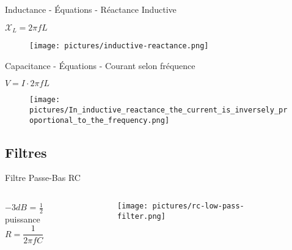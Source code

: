 \begin{frame}{Inductance - Équations - Réactance Inductive}
    \begin{center}
        \Large{
            $\mathcal{X}_L = 2 \pi f L$
        }
        \vspace{15pt}
        \begin{figure}
            \centering
            \texttt{[image: pictures/inductive-reactance.png]}
        \end{figure}
    \end{center}
\end{frame}

\begin{frame}{Capacitance - Équations - Courant selon fréquence}
    \begin{center}
        \Large{
            $V = I \cdot 2 \pi f L$
        }
        \vspace{15pt}
        \begin{figure}
            \centering
            \texttt{[image: pictures/In\_inductive\_reactance\_the\_current\_is\_inversely\_proportional\_to\_the\_frequency.png]}
        \end{figure}
    \end{center}
\end{frame}


\subsection{Filtres}
\begin{frame}{Filtre Passe-Bas RC}
    \begin{columns}
        \begin{column}{0.33\textwidth}
            \begin{center}
                $-3dB$ = $\frac{1}{2}$ puissance\\
                \vspace{10pt}
                \Large{$R = \dfrac{1}{2 \pi f C}$}
            \end{center}
        \end{column}
        
        \begin{column}{0.66\textwidth}
            \begin{figure}
                \centering
                \texttt{[image: pictures/rc-low-pass-filter.png]}
            \end{figure}
        \end{column}
    \end{columns}
\end{frame}

